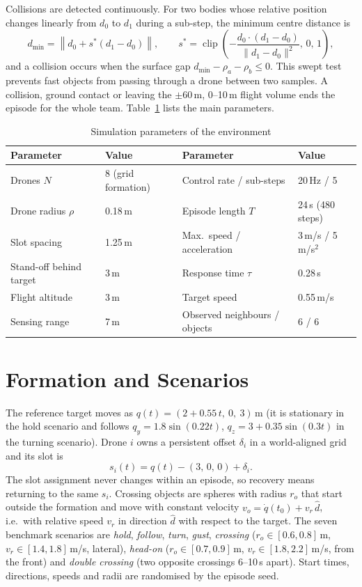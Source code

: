 Collisions are detected continuously. For two bodies whose relative position changes linearly from $d_0$ to
$d_1$ during a sub-step, the minimum centre distance is
\begin{equation}
  d_{\min} = \left\lVert d_0 + s^\ast (d_1 - d_0) \right\rVert, \qquad
  s^\ast = \operatorname{clip}\!\left(-\frac{d_0\cdot(d_1-d_0)}{\lVert d_1 - d_0\rVert^2},\,0,\,1\right),
  \label{eq:swept}
\end{equation}
and a collision occurs when the surface gap $d_{\min} - \rho_a - \rho_b \le 0$. This swept test prevents fast
objects from passing through a drone between two samples. A collision, ground contact or leaving the
$\pm 60$\,m, 0--10\,m flight volume ends the episode for the whole team. Table~\ref{tab:env} lists the main
parameters.

\begin{table}[htbp]
\centering
\caption{Simulation parameters of the environment}
\label{tab:env}
\small
\begin{tabular}{@{}llll@{}}
\toprule
Parameter & Value & Parameter & Value\\
\midrule
Drones $N$ & 8 (grid formation) & Control rate / sub-steps & 20\,Hz / 5\\
Drone radius $\rho$ & 0.18\,m & Episode length $T$ & 24\,s (480 steps)\\
Slot spacing & 1.25\,m & Max.\ speed / acceleration & 3\,m/s / 5\,m/s$^2$\\
Stand-off behind target & 3\,m & Response time $\tau$ & 0.28\,s\\
Flight altitude & 3\,m & Target speed & 0.55\,m/s\\
Sensing range & 7\,m & Observed neighbours / objects & 6 / 6\\
\bottomrule
\end{tabular}
\end{table}

\section{Formation and Scenarios}
The reference target moves as $q(t) = (2 + 0.55\,t,\ 0,\ 3)$\,m (it is stationary in the hold scenario and
follows $q_y = 1.8\sin(0.22t)$, $q_z = 3 + 0.35\sin(0.3t)$ in the turning scenario). Drone $i$ owns a
persistent offset $\delta_i$ in a world-aligned grid and its slot is
\begin{equation}
  s_i(t) = q(t) - (3,\,0,\,0) + \delta_i .
  \label{eq:slot}
\end{equation}
The slot assignment never changes within an episode, so recovery means returning to the same $s_i$.
Crossing objects are spheres with radius $r_o$ that start outside the formation and move with constant velocity
$v_o = \dot q(t_0) + v_r\,\hat d$, i.e.\ with relative speed $v_r$ in direction $\hat d$ with respect to the
target. The seven benchmark scenarios are \emph{hold}, \emph{follow}, \emph{turn}, \emph{gust},
\emph{crossing} ($r_o \in [0.6,0.8]$\,m, $v_r \in [1.4,1.8]$\,m/s, lateral), \emph{head-on}
($r_o \in [0.7,0.9]$\,m, $v_r \in [1.8,2.2]$\,m/s, from the front) and \emph{double crossing} (two opposite
crossings 6--10\,s apart). Start times, directions, speeds and radii are randomised by the episode seed.

